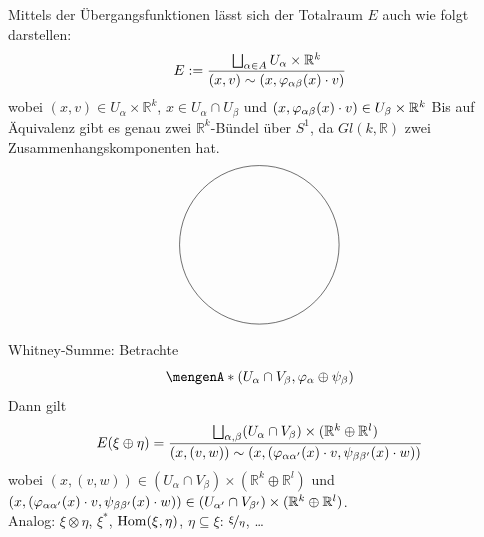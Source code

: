 Mittels der Übergangsfunktionen lässt sich der Totalraum $E$ auch wie folgt darstellen:
\[
	E := \frac{\bigsqcup_{\alpha \in A} U_\alpha \times \mathds{R}^k}{(x,v) \sim \enbrace*{x, \varphi_{\alpha \beta}(x) \cdot v}} 
\]
wobei $(x,v) \in U_\alpha \times \mathds{R}^k$, $x\in U_\alpha \cap U_\beta$ und $\enbrace*{x, \varphi_{\alpha \beta}(x) \cdot v} \in U_\beta \times \mathds{R}^k$
Bis auf Äquivalenz gibt es genau zwei $\mathds{R}^k$-Bündel über $S^1$, da $Gl(k,\mathds{R})$ zwei Zusammenhangskomponenten hat.
\[
	\begin{tikzpicture}
		\draw (0,0) circle[radius=2];
	\end{tikzpicture}
\]
Whitney-Summe: Betrachte
\[
	\set{\enbrace*{U_\alpha \cap V_\beta, \varphi_\alpha \oplus \psi_\beta}} 
\]
Dann gilt
\[
	E(\xi \oplus  \eta) = \frac{\bigsqcup_{\alpha,\beta} (U_\alpha \cap V_\beta) \times (\mathds{R}^k  \oplus  \mathds{R}^l)}{(x,(v,w)) \sim \enbrace*{x,
	\enbrace*{\varphi_{\alpha \alpha'}(x) \cdot v, \psi_{\beta \beta'}(x) \cdot w} } } 
\]
wobei $(x,(v,w)) \in (U_\alpha \cap V_\beta) \times (\mathds{R}^k \oplus \mathds{R}^l) $ und $\enbrace*{x,\enbrace*{\varphi_{\alpha \alpha'}(x) \cdot v, 
\psi_{\beta \beta'}(x) \cdot w} } \in (U_{\alpha'} \cap V_{\beta'}) \times (\mathds{R}^k \oplus \mathds{R}^l)$. \medskip \\
Analog: $\xi \otimes  \eta$, $\xi^*$, $\Hom(\xi, \eta)$, $\eta \subseteq \xi$: $\nicefrac{\xi}{\eta}$, \ldots 

\cleardoubleoddemptypage
{}
\setcounter{page}{1}
\printindex
\listoffigures

